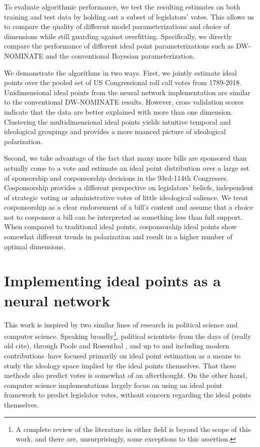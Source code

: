\documentclass[11pt,]{article}
\begin{document}
To evaluate algorithmic performance, we test the resulting estimates on
both training and test data by holding out a subset of legislators'
votes. This allows us to compare the quality of different model
parameterizations and choice of dimensions while still guarding against
overfitting. Specifically, we directly compare the performance of
different ideal point parameterizations such as DW-NOMINATE and the
conventional Bayesian parameterization.

We demonstrate the algorithms in two ways. First, we jointly estimate
ideal points over the pooled set of US Congressional roll call votes
from 1789-2018. Unidimensional ideal points from the neural network
implementation are similar to the conventional DW-NOMINATE results.
However, cross validation scores indicate that the data are better
explained with more than one dimension. Clustering the multidimensional
ideal points yields intuitive temporal and ideological groupings and
provides a more nuanced picture of ideological polarization.

Second, we take advantage of the fact that many more bills are sponsored
than actually come to a vote and estimate an ideal point distribution
over a large set of sponsorship and cosponsorship decisions in the
93rd-114th Congresses. Cosponsorship provides a different perspective on
legislators' beliefs, independent of strategic voting or administrative
votes of little ideological salience. We treat cosponsorship as a clear
endorsement of a bill's content and assume that a choice not to
cosponsor a bill can be interpreted as something less than full support.
When compared to traditional ideal points, cosponsorship ideal points
show somewhat different trends in polarization and result in a higher
number of optimal dimensions.

\section{Implementing ideal points as a neural
network}\label{implementing-ideal-points-as-a-neural-network}

This work is inspired by two similar lines of research in political
science and computer science. Speaking broadly\footnote{A complete
  review of the literature in either field is beyond the scope of this
  work, and there are, unsurprisingly, some exceptions to this
  assertion.}, political scientists--from the days of (really old cite),
through Poole and Rosenthal \cite{poole}, and up to and including modern
contributions--have focused primarily on ideal point estimation as a
means to study the ideology space implied by the ideal points
themselves. That these methods also predict votes is somewhat of an
afterthought. On the other hand, computer science implementations
largely focus on using an ideal point framework to predict legislator
votes, without concern regarding the ideal points themselves.
\end{document}
